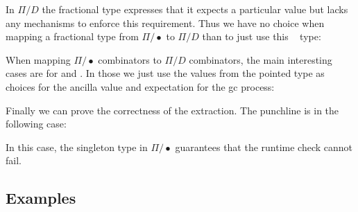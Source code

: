 \documentclass[sigplan,10pt,review,anonymous]{acmart}
\newcommand{\Acon}[1]{\AgdaInductiveConstructor{#1}}
\newcommand{\Avar}[1]{\AgdaBound{#1}}
\begin{document}
In $\Pi/D$ the fractional type expresses that it expects a particular
value but lacks any mechanisms to enforce this requirement. Thus we
have no choice when mapping a fractional type from $\Pi/\bullet$ to
$\Pi/D$ than to just use this \Acon{𝟙/}~\Avar{v} type:

\EXTu{}


When mapping $\Pi/\bullet$ combinators to
$\Pi/D$ combinators, the main interesting cases are for \Acon{η} and
\Acon{ε}. In those we just use the values from the pointed type as
choices for the ancilla value and expectation for the gc process:

\EXTcomb{}



Finally we can prove the correctness of the extraction. The punchline
is in the following case:

\EXTeq{}

In this case, the singleton type in $\Pi/\bullet$ guarantees that the
runtime check cannot fail.

\subsection{Examples}
\label{sec:cat}
\end{document}

